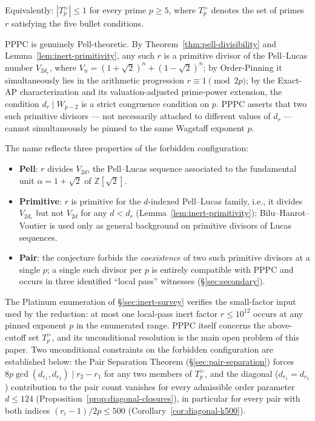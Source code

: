 \documentclass[11pt]{amsart}
\theoremstyle{plain}
\theoremstyle{definition}
\theoremstyle{remark}
\numberwithin{equation}{section}
\newcommand{\Z}{\mathbb{Z}}
\begin{document}
Equivalently: $|T_p^{>}| \leq 1$ for every prime $p \geq 5$, where $T_p^{>}$ denotes the set of primes $r$ satisfying the five bullet conditions.

PPPC is genuinely Pell-theoretic. By Theorem~\ref{thm:pell-divisibility} and Lemma~\ref{lem:inert-primitivity}, any such $r$ is a primitive divisor of the Pell--Lucas number $V_{2 d_r}$, where $V_n = (1+\sqrt 2)^n + (1-\sqrt 2)^n$; by Order-Pinning it simultaneously lies in the arithmetic progression $r \equiv 1 \pmod{2p}$; by the Exact-AP characterization and its valuation-adjusted prime-power extension, the condition $d_r \mid W_{p-2}$ is a strict congruence condition on $p$. PPPC asserts that two such primitive divisors --- not necessarily attached to different values of $d_r$ --- cannot simultaneously be pinned to the same Wagstaff exponent $p$.

The name reflects three properties of the forbidden configuration:

\begin{itemize}
\item \textbf{Pell}: $r$ divides $V_{2 d}$, the Pell--Lucas sequence associated to the fundamental unit $\alpha = 1 + \sqrt 2$ of $\Z[\sqrt 2]$.
\item \textbf{Primitive}: $r$ is primitive for the $d$-indexed Pell--Lucas family, i.e., it divides $V_{2 d_r}$ but not $V_{2 d}$ for any $d < d_r$ (Lemma~\ref{lem:inert-primitivity}); Bilu--Hanrot--Voutier \cite{ref:BHV} is used only as general background on primitive divisors of Lucas sequences.
\item \textbf{Pair}: the conjecture forbids the \emph{coexistence} of two such primitive divisors at a single $p$; a single such divisor per $p$ is entirely compatible with PPPC and occurs in three identified ``local pass'' witnesses (\S\ref{sec:secondary}).
\end{itemize}

The Platinum enumeration of \S\ref{sec:inert-survey} verifies the small-factor input used by the reduction: at most one local-pass inert factor $r \leq 10^{12}$ occurs at any pinned exponent $p$ in the enumerated range. PPPC itself concerns the above-cutoff set $T_p^{>}$, and its unconditional resolution is the main open problem of this paper. Two unconditional constraints on the forbidden configuration are established below: the Pair Separation Theorem (\S\ref{sec:pair-separation}) forces $8 p \gcd(d_{r_1}, d_{r_2}) \mid r_2 - r_1$ for any two members of $T_p^{>}$, and the diagonal ($d_{r_1} = d_{r_2}$) contribution to the pair count vanishes for every admissible order parameter $d \leq 124$ (Proposition~\ref{prop:diagonal-closures}), in particular for every pair with both indices $(r_i - 1)/2p \leq 500$ (Corollary~\ref{cor:diagonal-k500}).
\end{document}
